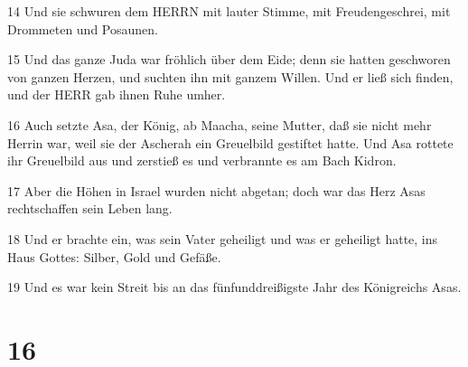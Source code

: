 \par 14 Und sie schwuren dem HERRN mit lauter Stimme, mit Freudengeschrei, mit Drommeten und Posaunen.
\par 15 Und das ganze Juda war fröhlich über dem Eide; denn sie hatten geschworen von ganzen Herzen, und suchten ihn mit ganzem Willen. Und er ließ sich finden, und der HERR gab ihnen Ruhe umher.
\par 16 Auch setzte Asa, der König, ab Maacha, seine Mutter, daß sie nicht mehr Herrin war, weil sie der Ascherah ein Greuelbild gestiftet hatte. Und Asa rottete ihr Greuelbild aus und zerstieß es und verbrannte es am Bach Kidron.
\par 17 Aber die Höhen in Israel wurden nicht abgetan; doch war das Herz Asas rechtschaffen sein Leben lang.
\par 18 Und er brachte ein, was sein Vater geheiligt und was er geheiligt hatte, ins Haus Gottes: Silber, Gold und Gefäße.
\par 19 Und es war kein Streit bis an das fünfunddreißigste Jahr des Königreichs Asas.

\chapter{16}

